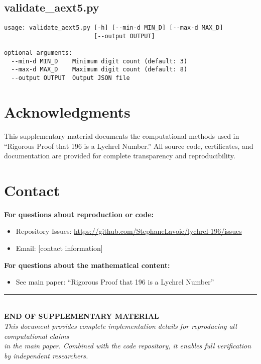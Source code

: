 \documentclass[11pt,a4paper]{article}
\begin{document}
\subsection{validate\_aext5.py}

\begin{lstlisting}[style=bashstyle]
usage: validate_aext5.py [-h] [--min-d MIN_D] [--max-d MAX_D] 
                         [--output OUTPUT]

optional arguments:
  --min-d MIN_D    Minimum digit count (default: 3)
  --max-d MAX_D    Maximum digit count (default: 8)
  --output OUTPUT  Output JSON file
\end{lstlisting}


\vspace{2cm}

\section*{Acknowledgments}

This supplementary material documents the computational methods used in ``Rigorous Proof that 196 is a Lychrel Number.'' All source code, certificates, and documentation are provided for complete transparency and reproducibility.

\section*{Contact}

\textbf{For questions about reproduction or code:}
\begin{itemize}
\item Repository Issues: \url{https://github.com/StephaneLavoie/lychrel-196/issues}
\item Email: [contact information]
\end{itemize}

\textbf{For questions about the mathematical content:}
\begin{itemize}
\item See main paper: ``Rigorous Proof that 196 is a Lychrel Number''
\end{itemize}

\vspace{1cm}

\begin{center}
\rule{\textwidth}{0.4pt}
\\[0.5cm]
\Large\textbf{END OF SUPPLEMENTARY MATERIAL}
\\[0.3cm]
\normalsize
\textit{This document provides complete implementation details for reproducing all computational claims}\\
\textit{in the main paper. Combined with the code repository, it enables full verification}\\
\textit{by independent researchers.}
\end{center}
\end{document}
